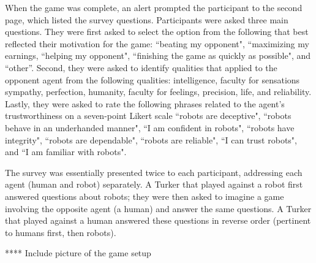 \documentclass{sig-alternate}
\begin{document}
When the game was complete, an alert prompted the participant to the second page, which listed the survey questions. Participants were asked three main questions. They were first asked to select the option from the following that best reflected their motivation for the game: ``beating my opponent", ``maximizing my earnings, ``helping my opponent", ``finishing the game as quickly as possible", and ``other''. Second, they were asked to identify qualities that applied to the opponent agent \cite{arras2000we} from the following qualities: intelligence, faculty for sensations sympathy, perfection, humanity, faculty for feelings, precision, life, and reliability. Lastly, they were asked to rate the following phrases related to the agent's trustworthiness on a seven-point Likert scale \cite{jian2000foundations} ``robots are deceptive", ``robots behave in an underhanded manner", ``I am confident in robots", ``robots have integrity", ``robots are dependable", ``robots are reliable", ``I can trust robots", and ``I am familiar with robots".

The survey was essentially presented twice to each participant, addressing each agent (human and robot) separately. A Turker that played against a robot first answered questions about robots; they were then asked to imagine a game involving the opposite agent (a human) and answer the same questions. A Turker that played against a human answered these questions in reverse order (pertinent to humans first, then robots). 


**** Include picture of the game setup\\


\end{document}
